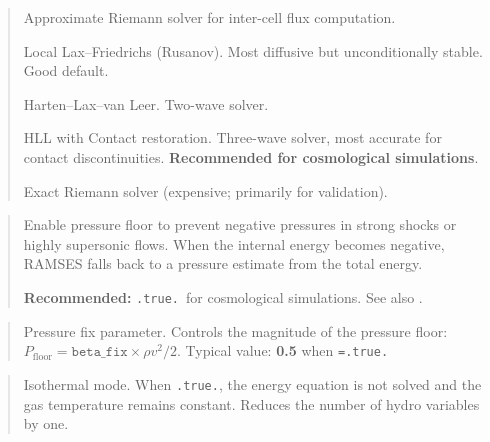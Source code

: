 \begin{quote}
Approximate Riemann solver for inter-cell flux computation.
\begin{description}[style=nextline,leftmargin=2.5cm,font=\ttfamily]
  \item[`llf'] Local Lax--Friedrichs (Rusanov).  Most diffusive but
    unconditionally stable.  Good default.
  \item[`hll'] Harten--Lax--van Leer.  Two-wave solver.
  \item[`hllc'] HLL with Contact restoration.  Three-wave solver,
    most accurate for contact discontinuities.
    \textbf{Recommended for cosmological simulations}.
  \item[`exact'] Exact Riemann solver (expensive; primarily for
    validation).
\end{description}
\end{quote}

\label{param:pressure_fix}

\begin{quote}
Enable pressure floor to prevent negative pressures in strong shocks
or highly supersonic flows.  When the internal energy becomes negative,
RAMSES falls back to a pressure estimate from the total energy.

\textbf{Recommended:} \texttt{.true.}\ for cosmological simulations.
See also .
\end{quote}

\label{param:beta_fix}

\begin{quote}
Pressure fix parameter.  Controls the magnitude of the pressure floor:
$P_{\text{floor}} = \texttt{beta\_fix} \times \rho v^2 / 2$.
Typical value: \textbf{0.5} when
\texttt{=.true.}
\end{quote}

\label{param:isothermal}

\begin{quote}
Isothermal mode.  When \texttt{.true.}, the energy equation is not
solved and the gas temperature remains constant.  Reduces the number
of hydro variables by one.
\end{quote}


